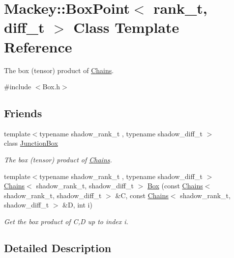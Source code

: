 \hypertarget{classMackey_1_1BoxPoint}{}\section{Mackey\+:\+:Box\+Point$<$ rank\+\_\+t, diff\+\_\+t $>$ Class Template Reference}
\label{classMackey_1_1BoxPoint}


The box (tensor) product of \hyperlink{classMackey_1_1Chains}{Chains}.  




{\ttfamily \#include $<$Box.\+h$>$}

\subsection*{Friends}
\begin{DoxyCompactItemize}
\item 
{\footnotesize template$<$typename shadow\+\_\+rank\+\_\+t , typename shadow\+\_\+diff\+\_\+t $>$ }\\class \hyperlink{classMackey_1_1BoxPoint_aa6b9506519f57502db8432843a492fd1}{Junction\+Box}
\begin{DoxyCompactList}\small\item\em The box (tensor) product of \hyperlink{classMackey_1_1Chains}{Chains}. \end{DoxyCompactList}\item 
{\footnotesize template$<$typename shadow\+\_\+rank\+\_\+t , typename shadow\+\_\+diff\+\_\+t $>$ }\\\hyperlink{classMackey_1_1Chains}{Chains}$<$ shadow\+\_\+rank\+\_\+t, shadow\+\_\+diff\+\_\+t $>$ \hyperlink{classMackey_1_1BoxPoint_a0d7cf2b5aed908bc9bc696c03b011d76}{Box} (const \hyperlink{classMackey_1_1Chains}{Chains}$<$ shadow\+\_\+rank\+\_\+t, shadow\+\_\+diff\+\_\+t $>$ \&C, const \hyperlink{classMackey_1_1Chains}{Chains}$<$ shadow\+\_\+rank\+\_\+t, shadow\+\_\+diff\+\_\+t $>$ \&D, int i)
\begin{DoxyCompactList}\small\item\em Get the box product of C,D up to index i. \end{DoxyCompactList}\end{DoxyCompactItemize}


\subsection{Detailed Description}
